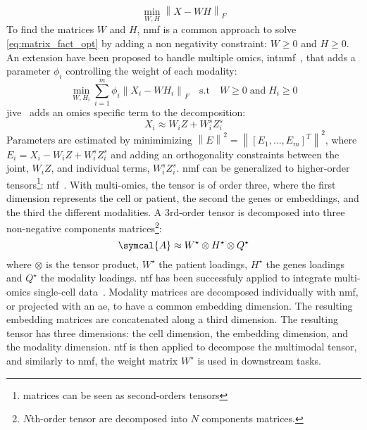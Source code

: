\documentclass[../main.tex]{subfiles}
\begin{document}
	\begin{equation}
	    \min_{W,H} {\left\| X - WH \right\|}_{F} \label{eq:matrix_fact_opt}
	\end{equation}%
	To find the matrices \(W\) and \(H\), \gls{nmf} is a common approach to solve \cref{eq:matrix_fact_opt} by adding a non negativity constraint: \(W \geq 0\) and \(H \geq 0\).
	An extension have been proposed to handle multiple omics, \gls{intnmf}~\cite{Chalise2017}, that adds a parameter \(\phi_{i}\) controlling the weight of each modality:
	\begin{equation}
	    \min_{W,H_i} \sum_{i=1}^{m} \phi_{i}{\left\| X_i - WH_i \right\|}_{F} \quad \text{s.t} \quad W \geq 0 \;\text{and}\; H_i \geq 0
	\end{equation}
	\Gls{jive}~\cite{Lock2013} adds an omics specific term to the decomposition:
	\begin{equation}
	    X_i \approx W_i Z + W_i^s Z_i^s
	\end{equation}
	Parameters are estimated by minimimizing \({\left\|E\right\|}^2 = {\left\|{\left[E_1, \ldots, E_m \right]}^T\right\|}^2\), where \(E_i = X_i - W_i Z + W_i^s Z_i^s\) and adding an orthogonality constraints between the joint, \(W_i Z\), and individual terms, \( W_i^s Z_i^s\).
	\Gls{nmf} can be generalized to higher-order tensors\footnote{matrices can be seen as second-orders tensors}: \gls{ntf}~\cite{Cichocki2009}.
	With multi-omics, the tensor is of order three, where the first dimension represents the cell or patient, the second the genes or embeddings, and the third the different modalities.
	A 3rd-order tensor is decomposed into three non-negative components matrices\footnote{\(N\)th-order tensor are decomposed into \(N\) components matrices.}:
	\begin{equation}
	    \symcal{A} \approx W^{\star}\otimes H^{\star} \otimes Q^{\star}
	\end{equation}
	where \(\otimes\) is the tensor product, \(W^{\star}\) the patient loadings, \(H^{\star}\) the genes loadings and \(Q^{\star}\) the modality loadings.
	\Gls{ntf} has been successfuly applied to integrate multi-omics single-cell data~\cite{Fogel2024}.
	Modality matrices are decomposed individually with \gls{nmf}, or projected with an \gls{ae}, to have a common embedding dimension.
	The resulting embedding matrices are concatenated along a third dimension.
	The resulting tensor has three dimensions: the cell dimension, the embedding dimension, and the modality dimension.
	\Gls{ntf} is then applied to decompose the multimodal tensor, and similarly to \gls{nmf}, the weight matrix \(W^{\star}\) is used in downstream tasks.
\end{document}
